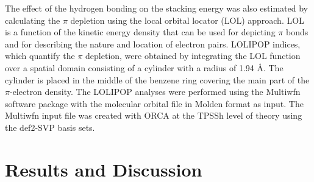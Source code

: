 \documentclass[twoside,twocolumn,9pt]{article}
\begin{document}
The effect of the hydrogen bonding on the stacking energy was also estimated by
calculating the $\pi$ depletion using the local orbital locator (LOL) approach.
LOL is a function of the kinetic energy density that can be used for depicting
$\pi$ bonds and for describing the nature and location of electron
pairs\cite{C2CC33886F}. LOLIPOP indices, which quantify the $\pi$ depletion,
were obtained by integrating the LOL function over a spatial domain consisting
of a cylinder with a radius of 1.94 {\AA}.  The cylinder is placed in the
middle of the benzene ring covering the main part of the $\pi$-electron
density\cite{C2CC33886F}. The LOLIPOP analyses were performed using the
Multiwfn software package\cite{https://doi.org/10.1002/jcc.22885} with the
molecular orbital file in Molden\cite{molden} format as input. The Multiwfn
input file was created with
ORCA\cite{https://doi.org/10.1002/wcms.81,https://doi.org/10.1002/wcms.1327} at
the TPSSh level of theory using the def2-SVP basis
sets\cite{doi:10.1063/1.1626543,doi:10.1063/1.1795692,Schafer:92}.


\section{Results and Discussion}
\label{sec:results}
\end{document}
